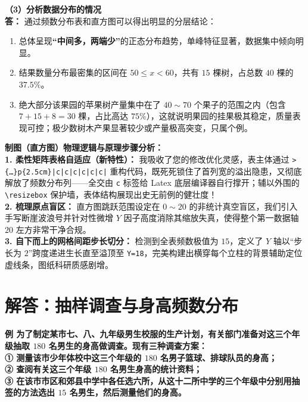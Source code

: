 \vspace{0.6cm}

\textbf{（3）分析数据分布的情况} \\
\textbf{答：} 通过频数分布表和直方图可以得出明显的分层结论：
\begin{enumerate}
    \item 总体呈现\textbf{“中间多，两端少”}的正态分布趋势，单峰特征显著，数据集中倾向明显。
    \item 结果数量分布最密集的区间在 $50 \leqslant x < 60$，共有 $15$ 棵树，占总数 $40$ 棵的 $37.5\%$。
    \item 绝大部分该果园的苹果树产量集中在了 $40 \sim 70$ 个果子的范围之内（包含 $7 + 15 + 8 = 30$ 棵，占比高达 $75\%$），这就说明果园的挂果极其稳定，质量表现可控；极少数树木产果显著较少或产量极高突变，只属个例。
\end{enumerate}

\vspace{0.6cm}

{\small\color{blue!70!black}
\textbf{制图（直方图）物理逻辑与原理步骤分析：}\\
\textbf{1. 柔性矩阵表格自适应（新特性）：} 我吸收了您的修改优化灵感，表主体通过 \texttt{>\{\dots\}p\{2.5cm\}|c|c|c|c|c|c|} 重构代码，既死死锁住了首列宽的溢出隐患，又彻底解放了频数分布列——全交由 \texttt{c} 标签给 Latex 底层编译器自行撑开；辅以外围的 \texttt{\textbackslash resizebox} 保护墙，表体结构展现出史无前例的健壮度！\\
\textbf{2. 梳理原点盲区：} 直方图跳跃范围设定在 $0 \sim 20$ 的非统计真空盲区，我们引入手写断崖波浪号并针对性微增 $Y$ 因子高度消除其缩放失真，使得整个第一数据轴 $20$ 左方非常干净合规。\\
\textbf{3. 自下而上的网格间距步长切分：} 检测到全表频数极值为 $15$，定义了 $Y$ 轴以“步长为 $2$”跨度递进生长直至溢顶至 \texttt{Y=18}，完美构建出横穿每个立柱的背景辅助定位虚线条，图纸科研质感剧增。
}

\newpage



\section{解答：抽样调查与身高频数分布}

\vspace{0.6cm}

\textbf{例 为了制定某市七、八、九年级男生校服的生产计划，有关部门准备对这三个年级抽取 $180$ 名男生的身高做调查。现有三种调查方案：\\
① 测量该市少年体校中这三个年级的 $180$ 名男子篮球、排球队员的身高；\\
② 查阅有关这三个年级 $180$ 名男生身高的统计资料；\\
③ 在该市市区和郊县中学中各任选六所，从这十二所中学的三个年级中分别用抽签的方法选出 $15$ 名男生，然后测量他们的身高。}

